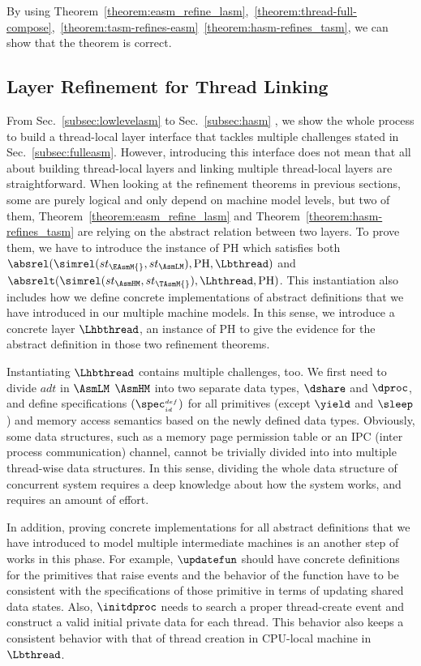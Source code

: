 By using Theorem~\ref{theorem:easm_refine_lasm},~\ref{theorem:thread-full-compose},~\ref{theorem:tasm-refines-easm}~\ref{theorem:hasm-refines_tasm}, we can show that the theorem is correct.



\subsection{Layer Refinement for Thread Linking}\label{subsec:concrete-impl}

From Sec.~\ref{subsec:lowlevelasm} to Sec.~\ref{subsec:hasm} ,
we show the whole process to 
build a thread-local layer interface
that tackles 
multiple challenges stated in Sec.~\ref{subsec:fulleasm}.
However, introducing this interface does not mean that all about building thread-local layers and 
linking multiple thread-local layers are straightforward. 
When looking at the refinement theorems in previous sections,
some are purely logical and only depend on machine model levels, 
but two of them, Theorem~\ref{theorem:easm_refine_lasm} and Theorem~\ref{theorem:hasm-refines_tasm} 
are relying on the abstract relation between two layers. 
To prove them, we have to introduce the instance of $\mathrm{PH}$ which satisfies both 
$\absrel(\simrel(st_{\EAsmM{}}, st_{\AsmLM}), \mathrm{PH}, \Lbthread)$ and 
$\absrelt(\simrel(st_{\AsmHM}, st_{\TAsmM{}}), \Lhthread, \mathrm{PH})$.
This instantiation also includes how we define concrete implementations of
abstract definitions that we have introduced in our multiple machine models. 
In this sense, we introduce a concrete layer $\Lhbthread$, an instance of $\mathrm{PH}$
to give the evidence for the abstract definition in those two refinement theorems.

Instantiating $\Lhbthread$ contains multiple challenges, too.
We first need to divide $adt$ in $\AsmLM$ $\AsmHM$  into two separate data types, $\dshare$ and $\dproc$, and
define specifications  $(\spec^{_{def}}_{_{id}})$  for all primitives (except $\yield$ and $\sleep$) 
and memory access semantics based on the  
newly defined data types. 
Obviously, some data structures, such as a memory page permission table or an IPC (inter process communication) channel, 
cannot be trivially divided into into multiple thread-wise data structures.
In this sense, dividing the whole data structure of concurrent system requires a deep knowledge about how the system works,
and requires an amount of effort. 

In addition, proving concrete implementations for all abstract definitions that we have introduced to model multiple intermediate machines
is an another step of works in this phase. 
For example, $\updatefun$ should have concrete definitions for the primitives that raise events
and the behavior of the function have to be consistent with the specifications of those primitive 
in terms of updating shared data states. 
Also, $\initdproc$ needs to search a proper thread-create event 
and construct a valid initial private data for each thread.
This behavior also keeps a consistent behavior with that of thread creation in CPU-local machine in 
$\Lbthread$. 

